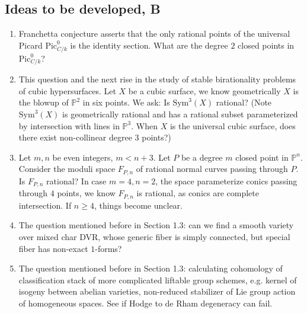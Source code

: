\documentclass[8pt]{amsart}
\begin{document}
\subsection{Ideas to be developed, B}
\begin{enumerate}
\item Franchetta conjecture asserts that the only rational points of the universal Picard $\mathrm{Pic}^0_{C/k}$ is the identity section. What are the degree $2$ closed points in $\mathrm{Pic}^0_{C/k}$?
\item This question and the next rise in the study of stable birationality problems of cubic hypersurfaces. Let $X$ be a cubic surface, we know geometrically $X$ is the blowup of $\mathbb{P}^2$ in six points. We ask: Is $\mathrm{Sym}^3(X)$ rational? (Note $\mathrm{Sym}^3(X)$ is geometrically rational and has a rational subset parameterized by intersection with lines in $\mathbb{P}^3$. When $X$ is the universal cubic surface, does there exist non-collinear degree 3 points?)
\item Let $m,n$ be even integers, $m<n+3$. Let $P$ be a degree $m$ closed point in $\mathbb{P}^n$. Consider the moduli space $F_{P,n}$ of rational normal curves passing through $P$. Is $F_{P,n}$ rational? In case $m=4,n=2$, the space parameterize conics passing through $4$ points, we know $F_{P,n}$ is rational, as conics are complete intersection. If $n\geq4$, things become unclear.
\item The question mentioned before in Section 1.3: can we find a smooth variety over mixed char DVR, whose generic fiber is simply connected, but special fiber has non-exact $1$-forms?
\item The question mentioned before in Section 1.3: calculating cohomology of classification stack of more complicated liftable group schemes, e.g. kernel of isogeny between abelian varieties, non-reduced stabilizer of Lie group action of homogeneous spaces. See if Hodge to de Rham degeneracy can fail.


\end{enumerate}
\end{document}
